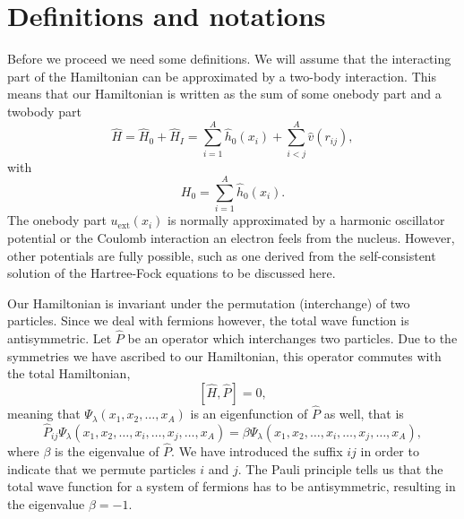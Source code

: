 \section{Definitions and notations}

Before we proceed we need some definitions.
We will assume that the interacting part of the Hamiltonian
can be approximated by a two-body interaction.
This means that our Hamiltonian is written as the sum of some onebody part and a twobody part
\begin{equation}
    \hat{H} = \hat{H}_0 + \hat{H}_I 
    = \sum_{i=1}^A \hat{h}_0(x_i) + \sum_{i < j}^A \hat{v}(r_{ij}),
\label{Hnuclei}
\end{equation}
with 
\begin{equation}
  H_0=\sum_{i=1}^A \hat{h}_0(x_i).
\label{hinuclei}
\end{equation}
The onebody part $u_{\mathrm{ext}}(x_i)$ is normally approximated by a harmonic oscillator potential or the Coulomb interaction an electron feels from the nucleus. However, other potentials are fully possible, such as 
one derived from the self-consistent solution of the Hartree-Fock equations to be discussed here.

Our Hamiltonian is invariant under the permutation (interchange) of two particles.
Since we deal with fermions however, the total wave function is antisymmetric.
Let $\hat{P}$ be an operator which interchanges two particles.
Due to the symmetries we have ascribed to our Hamiltonian, this operator commutes with the total Hamiltonian,
\[
[\hat{H},\hat{P}] = 0,
 \]
meaning that $\Psi_{\lambda}(x_1, x_2, \dots , x_A)$ is an eigenfunction of 
$\hat{P}$ as well, that is
\[
\hat{P}_{ij}\Psi_{\lambda}(x_1, x_2, \dots,x_i,\dots,x_j,\dots,x_A)=
\beta\Psi_{\lambda}(x_1, x_2, \dots,x_i,\dots,x_j,\dots,x_A),
\]
where $\beta$ is the eigenvalue of $\hat{P}$. We have introduced the suffix $ij$ in order to indicate that we permute particles $i$ and $j$.
The Pauli principle tells us that the total wave function for a system of fermions
has to be antisymmetric, resulting in the eigenvalue $\beta = -1$.   

